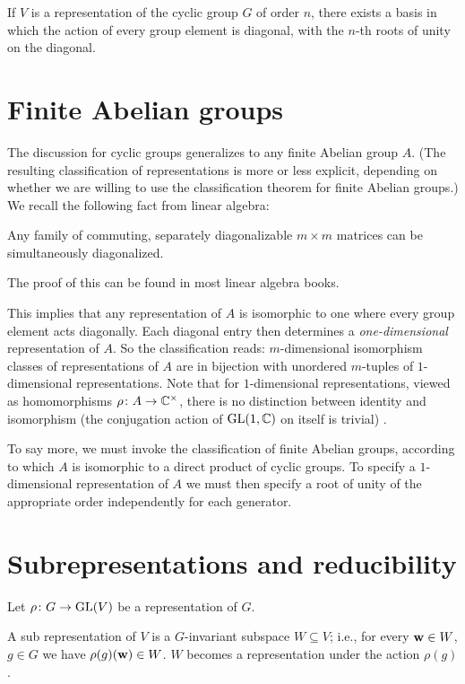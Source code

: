 \begin{proposition}
  If \(V\) is a representation of the cyclic group \(G\) of order \(n\),
  there exists a basis in which the action of every group element is
  diagonal, with the \(n\)-th roots of unity on the diagonal.
\end{proposition}
\section{Finite Abelian groups}
The discussion for cyclic groups generalizes to any finite Abelian group
\(A\). (The resulting classification of representations is more or less
explicit, depending on whether we are willing to use the classification
theorem for finite Abelian groups.) We recall the following fact from
linear algebra:
\begin{proposition}
  Any family of commuting, separately diagonalizable \(m\times m\) matrices
  can be simultaneously diagonalized.
\end{proposition}

The proof of this can be found in most linear algebra books.

This implies that any representation of \(A\) is isomorphic to one where
every group element acts diagonally. Each diagonal entry then determines a
\emph{one-dimensional} representation of \(A\). So the classification
reads: \(m\)-dimensional isomorphism classes of representations of \(A\)
are in bijection with unordered \(m\)-tuples of \(1\)-dimensional
representations. Note that for \(1\)-dimensional representations, viewed as
homomorphisms \(\rho\colon A\to\mathbb{C}^\times\), there is no distinction
between identity and isomorphism (the conjugation action of
\(\operatorname{GL}(1,\mathbb{C})\) on itself is trivial) .

To say more, we must invoke the classification of finite Abelian groups,
according to which \(A\) is isomorphic to a direct product of cyclic
groups. To specify a \(1\)-dimensional representation of \(A\) we must then
specify a root of unity of the appropriate order independently for each
generator.

\section{Subrepresentations and reducibility}
Let \(\rho\colon G\to\operatorname{GL}(V)\) be a representation of \(G\).

\begin{definition}
  A sub representation of \(V\) is a \(G\)-invariant subspace
  \(W\subseteq V\); i.e., for every \(\mathbf{w}\in W\), \(g\in G\) we have
  \(\rho(g)(\mathbf{w})\in W\). \(W\) becomes a representation under the action
  \(\rho(g)\).
\end{definition}

